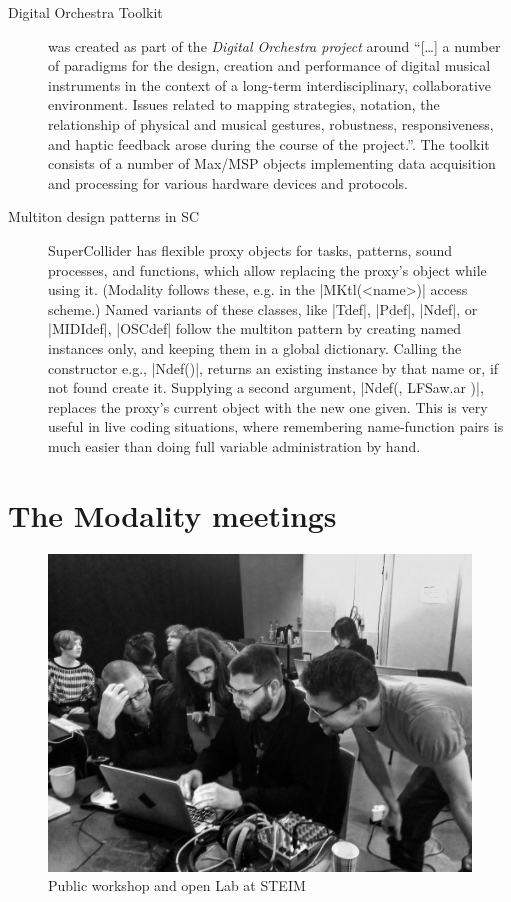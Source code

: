 \documentclass{article}
\begin{document}
\begin{description}
	\item[Digital Orchestra Toolkit] \cite{-dot} was created as part of the \emph{Digital Orchestra project} around \enquote{[\dots] a number of paradigms for the design, creation and performance of digital musical instruments in the context of a long-term interdisciplinary, collaborative environment. 
	Issues related to mapping strategies, notation, the relationship of physical and musical gestures, robustness, responsiveness, and haptic feedback arose during the course of the project.}\cite{ferguson-2009}. 
	The toolkit consists of a number of Max/MSP objects implementing data acquisition and processing for various hardware devices and protocols.
	
	\item[Multiton design patterns in SC] 
		SuperCollider has flexible proxy objects for tasks, patterns, sound processes, and functions, which allow replacing the proxy's object while using it. (Modality follows these, e.g. in the |MKtl(<name>)| access scheme.)
		Named variants of these classes, like |Tdef|, |Pdef|, |Ndef|, or |MIDIdef|, |OSCdef| follow the multiton pattern by creating named instances only, and keeping them in a global dictionary. 
		Calling the constructor e.g., |Ndef(\a)|, returns an existing instance by that name or, if not found create it. 
		Supplying a second argument, |Ndef(\a, { LFSaw.ar })|, replaces the proxy's current object with the new one given. 
		This is very useful in live coding situations, where remembering name-function pairs is much easier than doing full  variable administration by hand.
\end{description}




\section{The Modality meetings}
\label{sec:the_modality_meetings}

\begin{figure}[h]
	\centering
		\includegraphics[width=.9\columnwidth]{../media/20140403-IMG_1667.jpg}
	\caption{Public workshop and open Lab at STEIM}
	\label{fig:media_20140403-IMG_1667}
\end{figure}
\end{document}
